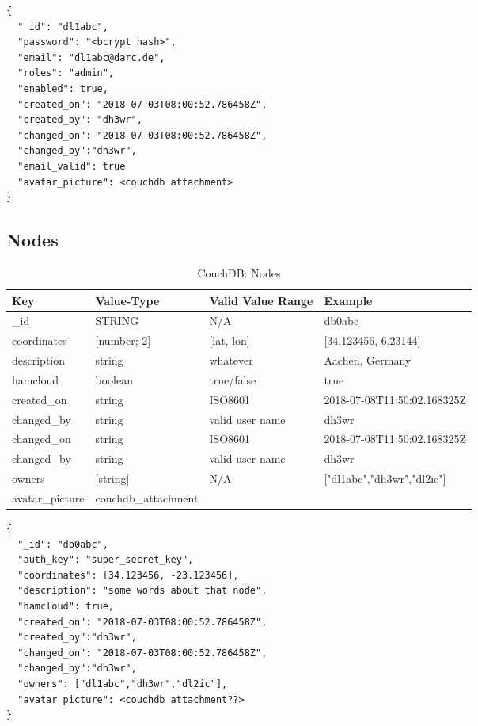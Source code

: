 \begin{lstlisting}
{
  "_id": "dl1abc",
  "password": "<bcrypt hash>",
  "email": "dl1abc@darc.de",
  "roles": "admin",
  "enabled": true,
  "created_on": "2018-07-03T08:00:52.786458Z",
  "created_by": "dh3wr",
  "changed_on": "2018-07-03T08:00:52.786458Z",
  "changed_by":"dh3wr",
  "email_valid": true
  "avatar_picture": <couchdb attachment>
}
\end{lstlisting}


\subsection{Nodes}
\begin{table}[h]
 \caption{CouchDB: Nodes}
 \begin{tabular}{|l|l|l|l|} \hline
  Key & Value-Type & Valid Value Range & Example \\
  \hline
  \_id & STRING & N/A & db0abc \\
  coordinates & [number; 2]  & [lat, lon] & [34.123456, 6.23144] \\
  description & string & whatever & Aachen, Germany\\
  hamcloud & boolean & true/false & true \\
  created\_on & string & ISO8601 & 2018-07-08T11:50:02.168325Z \\
  changed\_by & string & valid user name & dh3wr \\
  changed\_on & string & ISO8601 & 2018-07-08T11:50:02.168325Z \\
  changed\_by & string & valid user name & dh3wr \\
  owners & [string] & N/A & ["dl1abc","dh3wr","dl2ic"] \\
  avatar\_picture & couchdb\_attachment & & \\ \hline
  \end{tabular}
  \label{tab:couchdb:nodes}
\end{table}

\begin{lstlisting}
{
  "_id": "db0abc",
  "auth_key": "super_secret_key",
  "coordinates": [34.123456, -23.123456],
  "description": "some words about that node",
  "hamcloud": true,
  "created_on": "2018-07-03T08:00:52.786458Z",
  "created_by":"dh3wr",
  "changed_on": "2018-07-03T08:00:52.786458Z",
  "changed_by":"dh3wr",
  "owners": ["dl1abc","dh3wr","dl2ic"],
  "avatar_picture": <couchdb attachment??>
}
\end{lstlisting}

